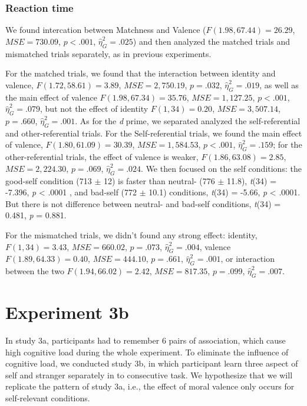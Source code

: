 \documentclass[
  english,
  man]{apa6}
\begin{document}
\hypertarget{reaction-time-4}{%
\subsubsection{Reaction time}\label{reaction-time-4}}

We found intercation between Matchness and Valence (\(F(1.98, 67.44) = 26.29\), \(\mathit{MSE} = 730.09\), \(p < .001\), \(\hat{\eta}^2_G = .025\)) and then analyzed the matched trials and mismatched trials separately, as in previous experiments.

For the matched trials, we found that the interaction between identity and valence, \(F(1.72, 58.61) = 3.89\), \(\mathit{MSE} = 2,750.19\), \(p = .032\), \(\hat{\eta}^2_G = .019\), as well as the main effect of valence \(F(1.98, 67.34) = 35.76\), \(\mathit{MSE} = 1,127.25\), \(p < .001\), \(\hat{\eta}^2_G = .079\), but not the effect of identity \(F(1, 34) = 0.20\), \(\mathit{MSE} = 3,507.14\), \(p = .660\), \(\hat{\eta}^2_G = .001\). As for the \emph{d} prime, we separated analyzed the self-referential and other-referential trials. For the Self-referential trials, we found the main effect of valence, \(F(1.80, 61.09) = 30.39\), \(\mathit{MSE} = 1,584.53\), \(p < .001\), \(\hat{\eta}^2_G = .159\); for the other-referential trials, the effect of valence is weaker, \(F(1.86, 63.08) = 2.85\), \(\mathit{MSE} = 2,224.30\), \(p = .069\), \(\hat{\eta}^2_G = .024\). We then focused on the self conditions: the good-self condition (713 \(\pm\) 12) is faster than neutral- (776 \(\pm\) 11.8), \emph{t}(34) = -7.396, \emph{p} \textless{} .0001 , and bad-self (772 \(\pm\) 10.1) conditions, \emph{t}(34) = -5.66, \emph{p} \textless{} .0001. But there is not difference between neutral- and bad-self conditions, \emph{t}(34) = 0.481, \emph{p} = 0.881.

For the mismatched trials, we didn't found any strong effect: identity, \(F(1, 34) = 3.43\), \(\mathit{MSE} = 660.02\), \(p = .073\), \(\hat{\eta}^2_G = .004\), valence \(F(1.89, 64.33) = 0.40\), \(\mathit{MSE} = 444.10\), \(p = .661\), \(\hat{\eta}^2_G = .001\), or interaction between the two \(F(1.94, 66.02) = 2.42\), \(\mathit{MSE} = 817.35\), \(p = .099\), \(\hat{\eta}^2_G = .007\).

\hypertarget{experiment-3b}{%
\section{Experiment 3b}\label{experiment-3b}}

In study 3a, participants had to remember 6 pairs of association, which cause high cognitive load during the whole experiment. To eliminate the influence of cognitive load, we conducted study 3b, in which participant learn three aspect of self and stranger separately in to consecutive task. We hypothesize that we will replicate the pattern of study 3a, i.e., the effect of moral valence only occurs for self-relevant conditions.
\end{document}
